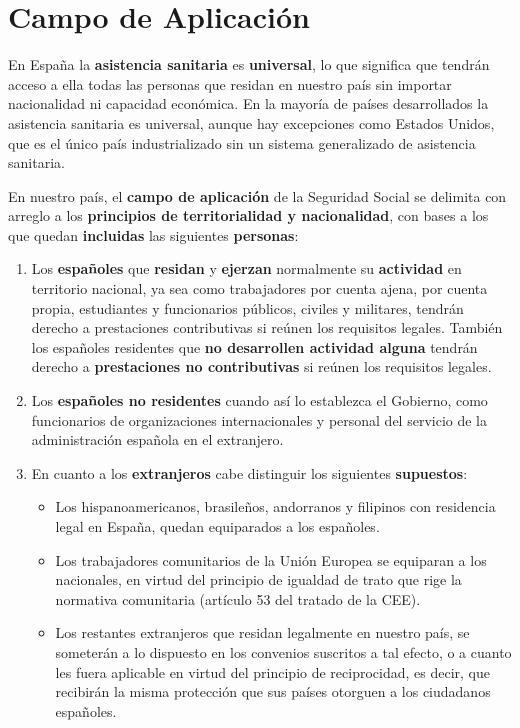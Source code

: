 \section{Campo de Aplicación}
En España la \textbf{asistencia sanitaria}  es \textbf{universal}, lo que significa que tendrán acceso a ella todas las personas que residan en nuestro país sin importar nacionalidad ni capacidad económica. En la mayoría de países desarrollados la asistencia sanitaria es universal, aunque hay excepciones como Estados Unidos, que es el único país industrializado sin un sistema generalizado  de asistencia sanitaria.

En nuestro país, el \textbf{campo de aplicación} de la Seguridad Social se delimita con arreglo a los \textbf{principios de territorialidad y nacionalidad}, con bases a los que quedan \textbf{incluidas} las siguientes \textbf{personas}:

\begin{enumerate}
    \item Los \textbf{españoles} que \textbf{residan} y \textbf{ejerzan}  normalmente su \textbf{actividad} en territorio nacional, ya sea como trabajadores por cuenta ajena, por cuenta propia, estudiantes y funcionarios públicos, civiles y militares, tendrán derecho a prestaciones contributivas si reúnen los requisitos legales. También los españoles residentes que \textbf{no desarrollen actividad alguna} tendrán derecho a \textbf{prestaciones no contributivas} si reúnen los requisitos legales.

    \item Los \textbf{españoles no residentes} cuando así lo establezca el Gobierno, como funcionarios de organizaciones internacionales y personal del servicio de la administración española en el extranjero.

    \item En cuanto a los \textbf{extranjeros} cabe distinguir los siguientes \textbf{supuestos}:
    \begin{itemize}
        \item Los hispanoamericanos, brasileños, andorranos y filipinos con residencia legal en España, quedan equiparados a los españoles.
        \item Los trabajadores comunitarios de la Unión Europea se equiparan a los nacionales, en virtud del principio de igualdad de trato que rige la normativa comunitaria (artículo 53 del tratado de la CEE).
        \item Los restantes extranjeros que residan legalmente en nuestro país, se someterán a lo dispuesto en los convenios suscritos a tal efecto, o a cuanto les fuera aplicable en virtud del principio de reciprocidad, es decir, que recibirán la misma protección que sus países otorguen a los ciudadanos españoles.
    \end{itemize}
\end{enumerate}

